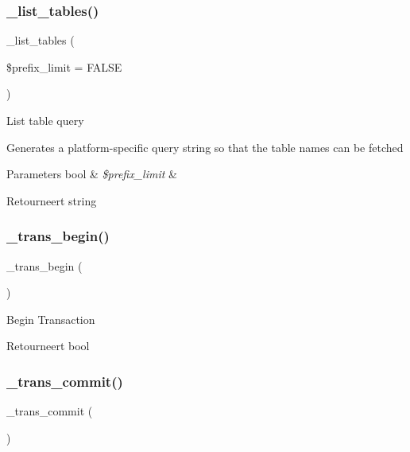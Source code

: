 \subsubsection{\texorpdfstring{\_list\_tables()}{\_list\_tables()}}
{\footnotesize\ttfamily \+\_\+list\+\_\+tables (\begin{DoxyParamCaption}\item[{}]{\$prefix\+\_\+limit = {\ttfamily FALSE} }\end{DoxyParamCaption})\hspace{0.3cm}{\ttfamily [protected]}}

List table query

Generates a platform-\/specific query string so that the table names can be fetched


\begin{DoxyParams}[1]{Parameters}
bool & {\em \$prefix\+\_\+limit} & \\
\hline
\end{DoxyParams}
\begin{DoxyReturn}{Retourneert}
string 
\end{DoxyReturn}
\mbox{\label{class_c_i___d_b__cubrid__driver_ac81ac882c1d54347d810199a15856aac}} 
\subsubsection{\texorpdfstring{\_trans\_begin()}{\_trans\_begin()}}
{\footnotesize\ttfamily \+\_\+trans\+\_\+begin (\begin{DoxyParamCaption}{ }\end{DoxyParamCaption})\hspace{0.3cm}{\ttfamily [protected]}}

Begin Transaction

\begin{DoxyReturn}{Retourneert}
bool 
\end{DoxyReturn}
\mbox{\label{class_c_i___d_b__cubrid__driver_a6fe7f373e0b11cfae23a5f41c0b35dda}} 
\subsubsection{\texorpdfstring{\_trans\_commit()}{\_trans\_commit()}}
{\footnotesize\ttfamily \+\_\+trans\+\_\+commit (\begin{DoxyParamCaption}{ }\end{DoxyParamCaption})\hspace{0.3cm}{\ttfamily [protected]}}

